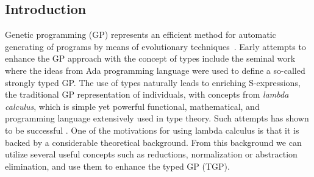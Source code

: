\documentclass[11pt]{article}
\newcommand{\red}[1]{{\color{red} #1}}
\begin{document}
\begin{article}
\section{Introduction}


Genetic programming (GP) represents an efficient method for automatic generating of programs by means of evolutionary techniques~\citep{koza92,koza2003genetic}. Early attempts to enhance the GP approach with the concept of types include the seminal work~\citep{montana95} where the ideas from Ada programming language were used to define a so-called strongly typed GP.   
The use of types naturally leads to enriching S-expressions,
the traditional GP representation of individuals, with concepts from
\textit{lambda calculus}, which is simple yet powerful functional, mathematical, and programming 
language extensively used in type theory. Such attempts has shown to be 
successful \cite{yu01}. 
One of the motivations for using lambda calculus is that it is backed by a considerable theoretical background. From this background we can utilize several useful concepts such as reductions, normalization or abstraction elimination, and use them to enhance the typed GP (TGP).









\end{article}
\end{document}

